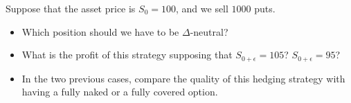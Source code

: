Suppose that the asset price is $S_0 = 100$, and we sell $1000$ puts. 

\begin{itemize}
    \item Which position should we have to be $\Delta$-neutral?
    \item What is the profit of this strategy supposing that $S_{0+\epsilon} = 105$? $S_{0+\epsilon} = 95$? 
    \item In the two previous cases, compare the quality of this hedging strategy with having a fully naked or a fully covered option.
\end{itemize}
